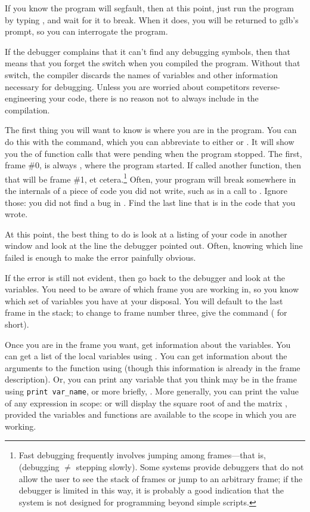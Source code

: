 If you know the program will segfault, then at this point, just run the program
by typing , and wait for it to break. When it does, you will
be returned to gdb's prompt, so you can interrogate the 
program. 

If the debugger complains that it can't find
any debugging symbols, then that means that you forget the 
switch when you compiled the program. Without that switch, the compiler
discards the names of variables and other information necessary for
debugging. Unless you are worried about competitors reverse-engineering
your code, there is no reason not to always include  in the
compilation.

The first thing you will want to know is where you are in the program. You
can do this with the  command, which you can abbreviate to
either  or . It will show you the  of function
calls that were pending when the program stopped.  The first, frame
\#0, is always , where the program started. If 
called another function, then that will be frame \#1, et
cetera.\footnote{Fast debugging frequently involves jumping among
frames---that is, (debugging $\neq$ stepping slowly).
Some systems provide debuggers that do not allow the user to see the
stack of frames or jump to an arbitrary frame; if the debugger is limited in
this way, it is probably a good indication that the system is not designed
for programming beyond simple scripts.} Often, your program will break
somewhere in the internals of a piece of code you did not write, such
as in a call to . Ignore those: you did not find a bug in
. Find the last line that is in the code that you wrote.

At this point, the best thing to do is look at a listing of your code
in another window and look at the line the debugger pointed out. Often,
knowing which line failed is enough to make the error painfully obvious.


If the error is still not evident, then go back to the debugger and look
at the variables. You need to be aware of which frame you are working in,
so you know which set of variables you have at your disposal.  You
will default to the last frame in the stack; to change to frame number
three, give the command  ( for short).

Once you are in the frame you want, get information about the
variables. You can get a list of the local variables using . You can get information about the arguments to the function
using  (though this information is already in the frame
description). Or, you can print any variable that you think may be in the
frame using {\tt print var\_name}, or more briefly, .
More generally, you can print the value of any expression in scope:
 or  will display the square
root of  and the matrix , provided the variables and
functions are available to the scope in which you are working.

